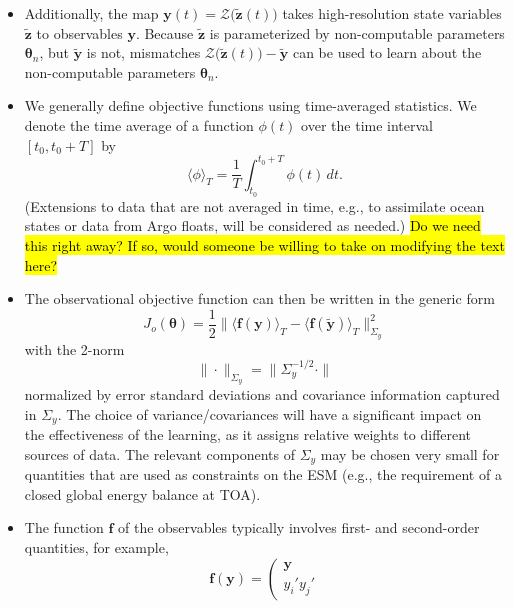 \documentclass{article}
\renewcommand{\vec}[1]{\boldsymbol{{#1}}}
\begin{document}
\begin{itemize}
    \item Additionally, the map $\vec{y}(t) = \mathcal{Z}\bigl(\vec{\tilde z}(t)\bigr)$ takes high-resolution state variables $\vec{\tilde z}$ to observables $\vec{y}$. Because $\vec{\tilde z}$ is parameterized by non-computable parameters $\vec{\theta}_n$, but $\vec{\tilde y}$ is not, mismatches $\mathcal{Z}\bigl(\vec{\tilde z}(t)\bigr) - \vec{\tilde y}$ can be used to learn about the non-computable parameters $\vec{\theta}_n$.
    \item We generally define objective functions using time-averaged statistics. We denote the time average of a function $\phi(t)$ over the time interval $[t_0,t_0+T]$ by
    \begin{equation}\label{e:Tavg}
    \langle \phi \rangle_T = \frac{1}{T} \int_{t_0}^{t_0+T} \phi(t) \, dt.
    \end{equation}
    (Extensions to data that are not averaged in time, e.g., to assimilate ocean states or data from Argo floats, will be considered as needed.) \hl{Do we need this right away? If so, would someone be willing to take on modifying the text here?}
    \item The observational objective function can then be written in the generic form
    \begin{equation}\label{e:obj_o}
    J_o(\vec{\theta})=\frac{1}{2}\| \langle \vec{f}(\vec{y})  \rangle_T - \langle \vec{f}(\vec{\tilde y})
    \rangle_T \|_{\Sigma_y}^2
    \end{equation}
    with the 2-norm
    \begin{equation}
    \|\cdot\|_{\Sigma_y}=\|\Sigma_y^{-1/2}\cdot\|
    \end{equation}
    normalized by error standard deviations and covariance information captured in $\Sigma_y$. The choice of variance/covariances will have a significant impact on the effectiveness of the learning, as it assigns relative weights to different sources of data. The relevant components of $\Sigma_y$ may be chosen very small for quantities that are used as constraints on the ESM (e.g., the requirement of a closed global energy balance at TOA).
    \item The function $\vec{f}$ of the observables typically involves first- and second-order quantities, for example,
    \begin{equation}
    \vec{f}(\vec{y}) = \left( 
    \begin{array}{c} 
    \vec{y}\\
    y_i' y_j'
    \end{array}

\end{equation}
\end{itemize}
\end{document}

